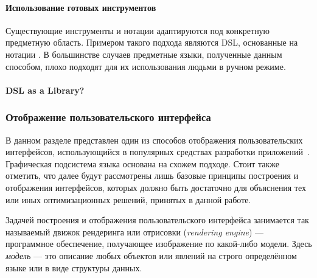 \paragraph{Использование готовых инструментов}
Существующие инструменты и нотации адаптируются под конкретную предметную
область. Примером такого подхода являются DSL, основанные на нотации
. В большинстве случаев предметные языки, полученные данным
способом, плохо подходят для их использования людьми в ручном режиме.

\paragraph{DSL as a Library?}

\newpage
\subsubsection{Отображение пользовательского интерфейса}
\label{section:render-pipeline}
В данном разделе представлен один из способов
отображения пользовательских интерфейсов, использующийся в популярных
средствах разработки приложений~\cite{flutter-homepage,swift-homepage,
vuenative-homepage,reactnative-homepage}. Графическая подсистема
языка  основана на схожем подходе. Стоит также отметить, что
далее будут рассмотрены лишь базовые принципы построения и отображения
интерфейсов, которых должно быть достаточно для объяснения тех или иных
оптимизационных решений, принятых в данной работе.

Задачей построения и отображения пользовательского интерфейса занимается
так называемый движок рендеринга или отрисовки (\textit{ren\-dering engine})
--- программное обеспечение, получающее изображение по какой-либо модели.
Здесь \textit{модель} --- это описание любых объектов или явлений на строго
определённом языке или в виде структуры данных.

